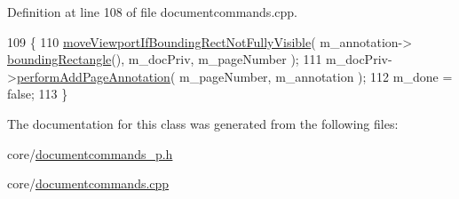 Definition at line 108 of file documentcommands.\+cpp.


\begin{DoxyCode}
109 \{
110     \hyperlink{namespaceOkular_a1e0f22fec5a200bd3b1835b7bfd95172}{moveViewportIfBoundingRectNotFullyVisible}( m\_annotation->
      \hyperlink{classOkular_1_1Annotation_a450fbd08aeb31262a33a628b4ab0dd42}{boundingRectangle}(), m\_docPriv, m\_pageNumber );
111     m\_docPriv->\hyperlink{classOkular_1_1DocumentPrivate_a374e55b575f2386536cd438bd2338b33}{performAddPageAnnotation}( m\_pageNumber,  m\_annotation );
112     m\_done = \textcolor{keyword}{false};
113 \}
\end{DoxyCode}


The documentation for this class was generated from the following files\+:\begin{DoxyCompactItemize}
\item 
core/\hyperlink{documentcommands__p_8h}{documentcommands\+\_\+p.\+h}\item 
core/\hyperlink{documentcommands_8cpp}{documentcommands.\+cpp}\end{DoxyCompactItemize}
